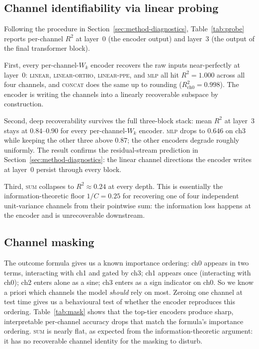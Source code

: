 \documentclass[11pt]{article}
\begin{document}
\subsection{Channel identifiability via linear probing}
\label{sec:results-probe}



Following the procedure in Section~\ref{sec:method-diagnostics},
Table~\ref{tab:probe} reports per-channel $R^2$ at layer~$0$ (the
encoder output) and layer~$3$ (the output of the final transformer
block).

First, every per-channel-$W_k$ encoder recovers the raw inputs
near-perfectly at layer~$0$: \textsc{linear}, \textsc{linear-ortho},
\textsc{linear-ppe}, and \textsc{mlp} all hit $R^2{=}1.000$
across all four channels, and \textsc{concat} does the same up to
rounding ($R^2_{\text{ch0}}{=}0.998$). The encoder is writing the
channels into a linearly recoverable subspace by construction.

Second, deep recoverability survives the full three-block stack:
mean $R^2$ at layer~$3$ stays at $0.84$--$0.90$ for every
per-channel-$W_k$ encoder. \textsc{mlp} drops to $0.646$ on ch3
while keeping the other three above $0.87$; the other encoders
degrade roughly uniformly. The result confirms the residual-stream
prediction in Section~\ref{sec:method-diagnostics}: the linear
channel directions the encoder writes at layer~$0$ persist through
every block.

Third, \textsc{sum} collapses to $R^2 \approx 0.24$ at every
depth. This is essentially the information-theoretic floor
$1/C = 0.25$ for recovering one of four independent unit-variance
channels from their pointwise sum: the information loss happens
at the encoder and is unrecoverable downstream.

\subsection{Channel masking}
\label{sec:results-mask}



The outcome formula gives us a known importance ordering: ch0
appears in two terms, interacting with ch1 and gated by ch3; ch1
appears once (interacting with ch0); ch2 enters alone as a sine;
ch3 enters as a sign indicator on ch0. So we know a priori which
channels the model \emph{should} rely on most.
Zeroing one channel at test time gives us a behavioural test of
whether the encoder reproduces this ordering. Table~\ref{tab:mask}
shows that the top-tier encoders produce sharp, interpretable
per-channel accuracy drops that match the formula's importance
ordering. \textsc{sum} is nearly flat, as expected from the
information-theoretic argument: it has no recoverable channel
identity for the masking to disturb.
\end{document}
